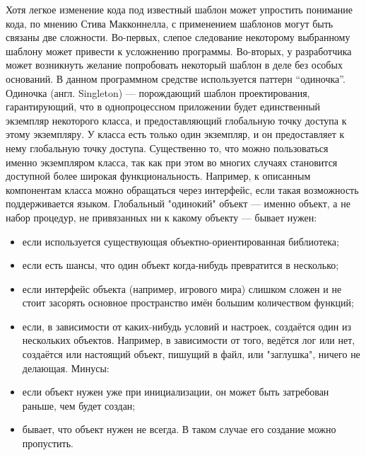 Хотя легкое изменение кода под известный шаблон может упростить понимание кода, по мнению Стива Макконнелла, с применением шаблонов могут быть связаны две сложности. Во-первых, слепое следование некоторому выбранному шаблону может привести к усложнению программы. Во-вторых, у разработчика может возникнуть желание попробовать некоторый шаблон в деле без особых оснований. В данном программном средстве используется паттерн “одиночка”.
Одиночка (англ. Singleton) — порождающий шаблон проектирования, гарантирующий, что в однопроцессном приложении будет единственный экземпляр некоторого класса, и предоставляющий глобальную точку доступа к этому экземпляру. У класса есть только один экземпляр, и он предоставляет к нему глобальную точку доступа. Существенно то, что можно пользоваться именно экземпляром класса, так как при этом во многих случаях становится доступной более широкая функциональность. Например, к описанным компонентам класса можно обращаться через интерфейс, если такая возможность поддерживается языком.
Глобальный "одинокий" объект — именно объект, а не набор процедур, не привязанных ни к какому объекту — бывает нужен:

\begin{itemize}
    \item если используется существующая объектно-ориентированная библиотека;
    \item если есть шансы, что один объект когда-нибудь превратится в несколько;
    \item если интерфейс объекта (например, игрового мира) слишком сложен и не стоит засорять основное пространство имён большим количеством функций;
    \item если, в зависимости от каких-нибудь условий и настроек, создаётся один из нескольких объектов. Например, в зависимости от того, ведётся лог или нет, создаётся или настоящий объект, пишущий в файл, или "заглушка", ничего не делающая.
    Минусы:
    \item если объект нужен уже при инициализации, он может быть затребован раньше, чем будет создан;
    \item бывает, что объект нужен не всегда. В таком случае его создание можно пропустить.
\end{itemize}

